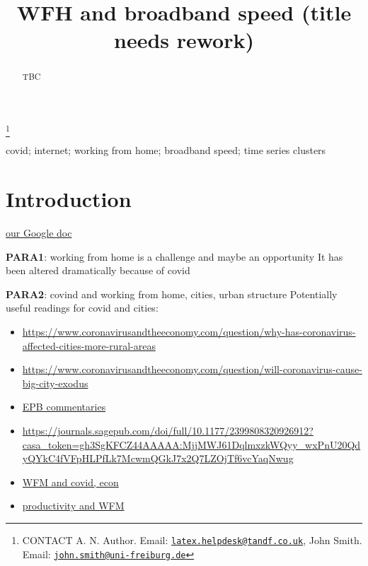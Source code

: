 \documentclass[]{interact}
\theoremstyle{plain}%
\theoremstyle{definition}
\theoremstyle{remark}
\def\tightlist{}
\begin{document}

\title{WFH and broadband speed (title needs rework)}


\author{
}

\thanks{CONTACT A. N. Author. Email: \href{mailto:latex.helpdesk@tandf.co.uk}{\nolinkurl{latex.helpdesk@tandf.co.uk}}, John Smith. Email: \href{mailto:john.smith@uni-freiburg.de}{\nolinkurl{john.smith@uni-freiburg.de}}}

\maketitle

\begin{abstract}
TBC
\end{abstract}

\begin{keywords}
covid; internet; working from home; broadband speed; time series
clusters
\end{keywords}

\hypertarget{introduction}{%
\section{Introduction}\label{introduction}}

\href{https://docs.google.com/document/d/1PWjkmgzWGYKR9wFogKYw7l-8mZLoORt593x-Tu-f2-M/edit\#heading=h.i5om1o8wpcd9}{our
Google doc}

\textbf{PARA1}: working from home is a challenge and maybe an
opportunity \citep[use arguments from][]{BUDNITZ2020102713} It has been
altered dramatically because of covid

\textbf{PARA2}: covind and working from home, cities, urban structure
Potentially useful readings for covid and cities:

\begin{itemize}
\tightlist
\item
  \url{https://www.coronavirusandtheeconomy.com/question/why-has-coronavirus-affected-cities-more-rural-areas}
\item
  \url{https://www.coronavirusandtheeconomy.com/question/will-coronavirus-cause-big-city-exodus}
\item
  \href{https://journals.sagepub.com/toc/EPB/current}{EPB commentaries}
\item
  \url{https://journals.sagepub.com/doi/full/10.1177/2399808320926912?casa_token=gh3SgKFCZ44AAAAA:MjjMWJ61DqlmxzkWQyy_wxPnU20QdyQYkC4fVFpHLPfLk7McwmQGkJ7x2Q7LZOjTf6vcYaqNwug}
\item
  \href{https://www.coronavirusandtheeconomy.com/question/what-has-coronavirus-taught-us-about-working-home}{WFM
  and covid, econ}
\item
  \href{https://www.coronavirusandtheeconomy.com/question/who-can-work-home-and-how-does-it-affect-their-productivity}{productivity
  and WFM}
\end{itemize}
\end{document}
